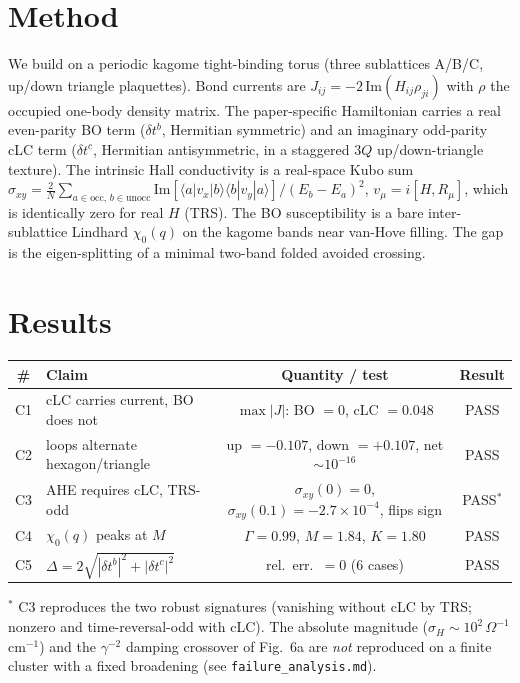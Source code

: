 \documentclass[11pt]{article}
\begin{document}
\section{Method}
We build on a periodic kagome tight-binding torus (three sublattices A/B/C,
up/down triangle plaquettes). Bond currents are
$J_{ij}=-2\,\mathrm{Im}(H_{ij}\rho_{ji})$ with $\rho$ the occupied one-body
density matrix. The paper-specific Hamiltonian carries a real even-parity BO
term ($\delta t^b$, Hermitian symmetric) and an imaginary odd-parity cLC term
($\delta t^c$, Hermitian antisymmetric, in a staggered 3$Q$ up/down-triangle
texture). The intrinsic Hall conductivity is a real-space Kubo sum
$\sigma_{xy}=\frac{2}{N}\sum_{a\in\mathrm{occ},\,b\in\mathrm{unocc}}
\mathrm{Im}[\langle a|v_x|b\rangle\langle b|v_y|a\rangle]/(E_b-E_a)^2$,
$v_\mu=i[H,R_\mu]$, which is identically zero for real $H$ (TRS). The BO
susceptibility is a bare inter-sublattice Lindhard $\chi_0(q)$ on the kagome
bands near van-Hove filling. The gap is the eigen-splitting of a minimal
two-band folded avoided crossing.

\section{Results}
\begin{table}[h]\centering
\begin{tabular}{clcc}
\toprule
\# & Claim & Quantity / test & Result \\
\midrule
C1 & cLC carries current, BO does not & $\max|J|$: BO $=0$, cLC $=0.048$ & \textcolor{green!60!black}{PASS}\\
C2 & loops alternate hexagon/triangle & up $=-0.107$, down $=+0.107$, net $\sim\!10^{-16}$ & \textcolor{green!60!black}{PASS}\\
C3 & AHE requires cLC, TRS-odd & $\sigma_{xy}(0)=0$, $\sigma_{xy}(0.1)=-2.7\!\times\!10^{-4}$, flips sign & \textcolor{green!60!black}{PASS$^\ast$}\\
C4 & $\chi_0(q)$ peaks at $M$ & $\Gamma=0.99$, $M=1.84$, $K=1.80$ & \textcolor{green!60!black}{PASS}\\
C5 & $\Delta=2\sqrt{|\delta t^b|^2+|\delta t^c|^2}$ & rel.\ err.\ $=0$ (6 cases) & \textcolor{green!60!black}{PASS}\\
\bottomrule
\end{tabular}
\end{table}

$^\ast$ C3 reproduces the two robust signatures (vanishing without cLC by TRS;
nonzero and time-reversal-odd with cLC). The absolute magnitude
($\sigma_H\!\sim\!10^2\,\Omega^{-1}$cm$^{-1}$) and the $\gamma^{-2}$ damping
crossover of Fig.~6a are \emph{not} reproduced on a finite cluster with a fixed
broadening (see \texttt{failure\_analysis.md}).
\end{document}
